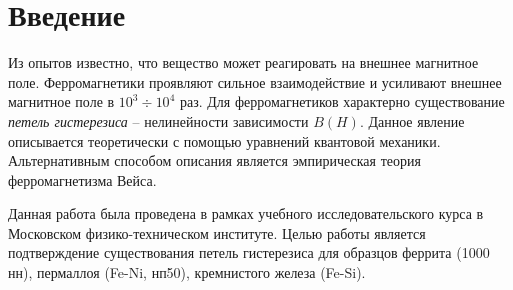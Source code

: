 \section*{Введение}

Из опытов известно, что вещество может реагировать на внешнее магнитное поле. Ферромагнетики проявляют сильное взаимодействие и усиливают внешнее магнитное поле в $10^3 \div 10^4$ раз. Для ферромагнетиков характерно существование \textit{петель гистерезиса} -- нелинейности зависимости $B(H)$. Данное явление описывается теоретически с помощью уравнений квантовой механики. Альтернативным способом описания является эмпирическая теория ферромагнетизма Вейса.

Данная работа была проведена в рамках учебного исследовательского курса в Московском физико-техническом институте. Целью работы является подтверждение существования петель гистерезиса для образцов феррита (1000 нн), пермаллоя (Fe-Ni, нп50), кремнистого железа (Fe-Si).

